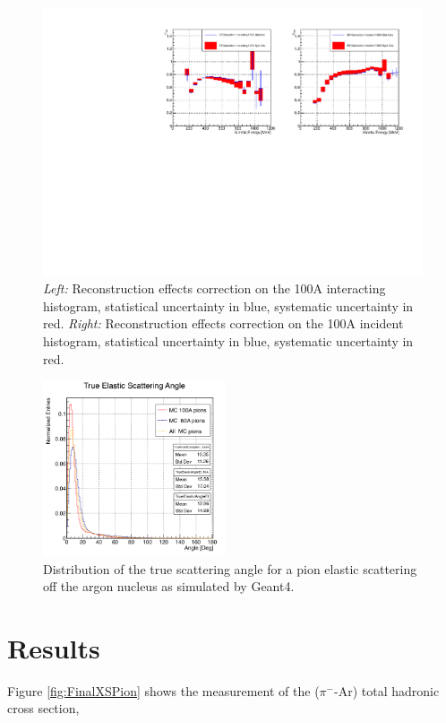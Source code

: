 \begin{figure}[p]
\centering
\includegraphics[width=\textwidth]{Chapter-6/Images/100AEffCorr.pdf}
\caption{\emph{Left:} Reconstruction effects correction on the 100A interacting histogram, statistical uncertainty in blue, systematic uncertainty in red. \emph{Right:}  Reconstruction effects correction on the 100A incident histogram, statistical uncertainty in blue, systematic uncertainty in red.}
\label{fig:EffCorr100A}
\end{figure}



\begin{figure}[p]
\centering
\includegraphics[width=0.48\textwidth]{Chapter-5/Images//cAngleTrue.png}
\caption{Distribution of the true scattering angle for a pion elastic scattering off the argon nucleus as simulated by Geant4.}
\label{fig:trueScatteringAngle}
\end{figure}




\clearpage
\section{Results}\label{ch:FinalPion}
Figure \ref{fig:FinalXSPion} shows the measurement of the ($\pi^-$-Ar) total hadronic cross section, 


